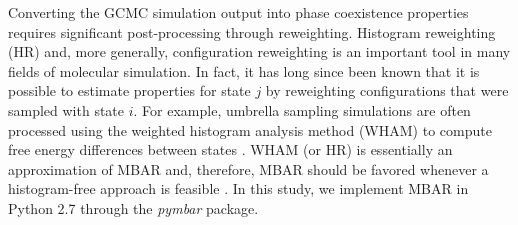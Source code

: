 \documentclass[journal=jced,manuscript=article]{achemso}
\begin{document}
%




Converting the GCMC simulation output into phase coexistence properties requires significant post-processing through reweighting. Histogram reweighting (HR) and, more generally, configuration reweighting is an important tool in many fields of molecular simulation. In fact, it has long since been known that it is possible to estimate properties for state $j$ by reweighting configurations that were sampled with state $i$. \cite{McDonald1967,Card1970,Wood1968,Pana2000} For example, umbrella sampling simulations are often processed using the weighted histogram analysis method (WHAM) to compute free energy differences between states \cite{Kumar1992}. WHAM (or HR) is essentially an approximation of MBAR and, therefore, MBAR should be favored whenever a histogram-free approach is feasible \cite{Matos2017}. In this study, we implement MBAR in Python 2.7 through the \textit{pymbar} package. 
\end{document}
